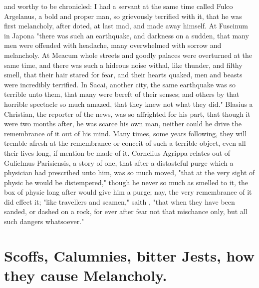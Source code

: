 and worthy to be chronicled: I had a servant at the same time called Fulco
Argelanus, a bold and proper man, so grievously terrified with it, that he
was first melancholy, after doted, at last mad, and made
away himself. At Fuscinum in Japona "there was such an
earthquake, and darkness on a sudden, that many men were offended with
headache, many overwhelmed with sorrow and melancholy. At Meacum whole streets
and goodly palaces were overturned at the same time, and there was such a
hideous noise withal, like thunder, and filthy smell, that their hair stared
for fear, and their hearts quaked, men and beasts were incredibly terrified. In
Sacai, another city, the same earthquake was so terrible unto them, that many
were bereft of their senses; and others by that horrible spectacle so much
amazed, that they knew not what they did." Blasius a Christian, the reporter of
the news, was so affrighted for his part, that though it were two months after,
he was scarce his own man, neither could he drive the remembrance of it out of
his mind. Many times, some years following, they will tremble afresh at the
remembrance or conceit of such a terrible object, even all
their lives long, if mention be made of it. Cornelius Agrippa relates out of
Gulielmus Parisiensis, a story of one, that after a distasteful purge which a
physician had prescribed unto him, was so much moved,
"that at the very sight of physic he would be
distempered," though he never so much as smelled to it, the box of physic long
after would give him a purge; nay, the very remembrance of it did effect it;
"like travellers and seamen," saith \Plutarch{}, "that when
they have been sanded, or dashed on a rock, for ever after fear not that
mischance only, but all such dangers whatsoever."

\section[Scoffs, bitter Jests]{Scoffs, Calumnies, bitter Jests, how they cause Melancholy.}\label{sec:scoffs-bitter-jests}

